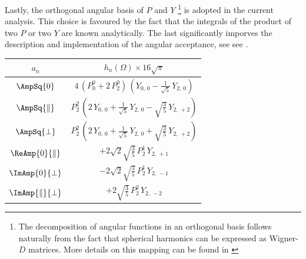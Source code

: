 Lastly, the orthogonal angular basis of $P$ and $Y$
\footnote{The decomposition of angular functions in an orthogonal basis follows naturally from the fact that spherical
harmonics can be expressed as Wigner-$D$ matrices. More details on this mapping can be found in \cite{jeroenThesis} }
is adopted in the current analysis. This choice is favoured by the fact that the integrals of the product of
two $P$ or two $Y$ are known analytically. The last significantly imporves the description and implementation
of the angular acceptance, see see .

\begin{table}[t]
  \centering
  \renewcommand{\arraystretch}{1.2}
  \begin{tabular}{cc}
    \hline
      $a_n$  &
      $h_n(\Omega) \times 16\sqrt{\pi}$       \\ %

    \hline
      $\AmpSq{0}$   &
      $4\, (P_0^0 + 2\, P_2^0)\, (Y_{0,\,0} - \tfrac{1}{\sqrt{5}}\, Y_{2,\,0})$  \\ %

    $\AmpSq{\parallel}$  &
      $P_2^2\, (2\, Y_{0,\,0} + \tfrac{1}{\sqrt{5}}\, Y_{2,\,0} - \sqrt{\tfrac{3}{5}}\, Y_{2,\,+2})$ \\ %

    $\AmpSq{\perp}$  &
      $P_2^2\, (2\, Y_{0,\,0} + \tfrac{1}{\sqrt{5}}\, Y_{2,\,0} + \sqrt{\tfrac{3}{5}}\, Y_{2,\,+2})$  \\ %

    $\ReAmp{0}{\parallel}$  &
      $+2\sqrt{2}\sqrt{\tfrac{3}{5}}\, P_2^1\, Y_{2,\,+1}$  \\ %

    $\ImAmp{0}{\perp}$  &
      $-2\sqrt{2}\sqrt{\tfrac{3}{5}}\, P_2^1\, Y_{2,\,-1}$  \\ %


    $\ImAmp{\parallel}{\perp}$  &
      $+2\sqrt{\tfrac{3}{5}}\, P_2^2\, Y_{2,\,-2}$  \\ %


\end{tabular}
\end{table}
